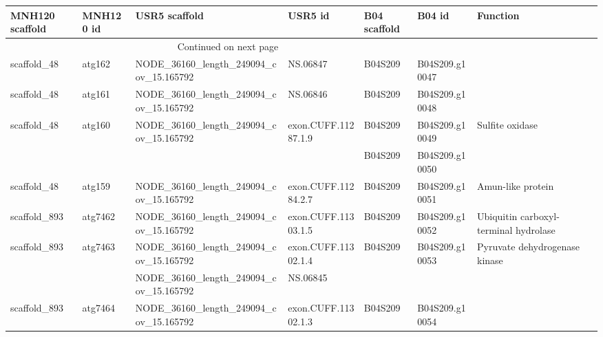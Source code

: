 \begin{longtable}{lllllll}
\toprule
MNH120 scaffold & MNH120 id &                           USR5 scaffold &               USR5 id & B04 scaffold &          B04 id &                                                                 Function \\
\endhead
\midrule
\multicolumn{3}{r}{{Continued on next page}} \\
\midrule
\endfoot

\bottomrule
\endlastfoot
    scaffold\_48 &    atg162 &  NODE\_36160\_length\_249094\_cov\_15.165792 &              NS.06847 &      B04S209 &  B04S209.g10047 &                                                                                 \\
    scaffold\_48 &    atg161 &  NODE\_36160\_length\_249094\_cov\_15.165792 &              NS.06846 &      B04S209 &  B04S209.g10048 &                                                                                 \\
    scaffold\_48 &    atg160 &  NODE\_36160\_length\_249094\_cov\_15.165792 &   exon.CUFF.11287.1.9 &      B04S209 &  B04S209.g10049 &                                                                 Sulfite oxidase \\
                &           &                                         &                       &      B04S209 &  B04S209.g10050 &                                                                                 \\
    scaffold\_48 &    atg159 &  NODE\_36160\_length\_249094\_cov\_15.165792 &   exon.CUFF.11284.2.7 &      B04S209 &  B04S209.g10051 &                                                               Amun-like protein \\
   scaffold\_893 &   atg7462 &  NODE\_36160\_length\_249094\_cov\_15.165792 &   exon.CUFF.11303.1.5 &      B04S209 &  B04S209.g10052 &                                           Ubiquitin carboxyl-terminal hydrolase \\
   scaffold\_893 &   atg7463 &  NODE\_36160\_length\_249094\_cov\_15.165792 &   exon.CUFF.11302.1.4 &      B04S209 &  B04S209.g10053 &                                                   Pyruvate dehydrogenase kinase \\
                &           &  NODE\_36160\_length\_249094\_cov\_15.165792 &              NS.06845 &              &                 &                                                                                 \\
   scaffold\_893 &   atg7464 &  NODE\_36160\_length\_249094\_cov\_15.165792 &   exon.CUFF.11302.1.3 &      B04S209 &  B04S209.g10054 &                                                                                 \\

\end{longtable}
